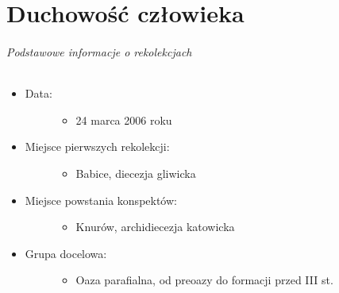 \documentclass[a5paper,10pt,polish]{book}
\begin{document}
\part{Duchowość człowieka}
\label{babice2006-wiosna-knurow/index::doc}\label{babice2006-wiosna-knurow/index:duchowosc-czlowieka}\paragraph{Podstawowe informacje o rekolekcjach}
\begin{itemize}
\item {} \begin{description}
\item[{Data:}] \leavevmode\begin{itemize}
\item {} 
24 marca 2006 roku

\end{itemize}

\end{description}

\item {} \begin{description}
\item[{Miejsce pierwszych rekolekcji:}] \leavevmode\begin{itemize}
\item {} 
Babice, diecezja gliwicka

\end{itemize}

\end{description}

\item {} \begin{description}
\item[{Miejsce powstania konspektów:}] \leavevmode\begin{itemize}
\item {} 
Knurów, archidiecezja katowicka

\end{itemize}

\end{description}

\item {} \begin{description}
\item[{Grupa docelowa:}] \leavevmode\begin{itemize}
\item {} 
Oaza parafialna, od preoazy do formacji przed III st.


\end{itemize}
\end{description}
\end{itemize}
\end{document}
